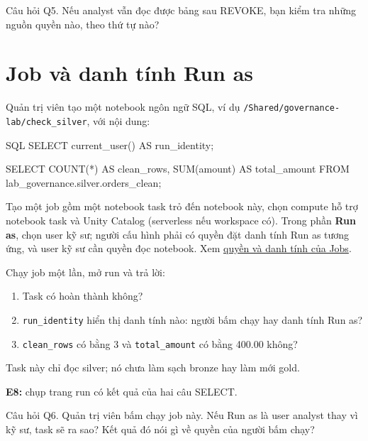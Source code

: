 \begin{questionbox}{Câu hỏi Q5.}
Nếu analyst vẫn đọc được bảng sau REVOKE, bạn kiểm tra những nguồn quyền nào, theo thứ tự nào?
\end{questionbox}

\section{Job và danh tính Run as}

Quản trị viên tạo một notebook ngôn ngữ SQL, ví dụ \texttt{/\allowbreak{}Shared/\allowbreak{}governance-\allowbreak{}lab/\allowbreak{}check\_\allowbreak{}silver}, với nội dung:


\begin{aivncodebox}[language={}]{SQL}
SELECT current_user() AS run_identity;

SELECT COUNT(*) AS clean_rows, SUM(amount) AS total_amount
FROM lab_governance.silver.orders_clean;
\end{aivncodebox}

Tạo một job gồm một notebook task trỏ đến notebook này, chọn compute hỗ trợ notebook task và Unity Catalog (serverless nếu workspace có). Trong phần \textbf{Run as}, chọn user kỹ sư; người cấu hình phải có quyền đặt danh tính Run as tương ứng, và user kỹ sư cần quyền đọc notebook. Xem \href{https://docs.databricks.com/aws/en/jobs/privileges}{quyền và danh tính của Jobs}.


Chạy job một lần, mở run và trả lời:


\begin{enumerate}
\item Task có hoàn thành không?
\item \texttt{run\_\allowbreak{}identity} hiển thị danh tính nào: người bấm chạy hay danh tính Run as?
\item \texttt{clean\_\allowbreak{}rows} có bằng 3 và \texttt{total\_\allowbreak{}amount} có bằng 400.00 không?
\end{enumerate}

Task này chỉ đọc silver; nó chưa làm sạch bronze hay làm mới gold.


\begin{evidencebox}
\textbf{E8:} chụp trang run có kết quả của hai câu SELECT.
\end{evidencebox}

\begin{questionbox}{Câu hỏi Q6.}
Quản trị viên bấm chạy job này. Nếu Run as là user analyst thay vì kỹ sư, task sẽ ra sao? Kết quả đó nói gì về quyền của người bấm chạy?
\end{questionbox}

